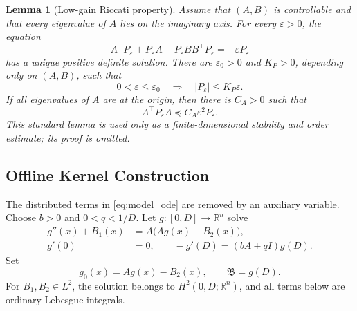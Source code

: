\documentclass[journal]{IEEEtran}
\newtheorem{lemma}{Lemma}
\newcommand{\R}{\mathbb R}
\newcommand{\eps}{\varepsilon}
\newcommand{\Bcal}{\mathfrak B}
\newcommand{\abs}[1]{\left|#1\right|}
\begin{document}
\begin{lemma}[Low-gain Riccati property]\label{lem:riccati}
Assume that \((A,B)\) is controllable and that every eigenvalue of \(A\) lies on the imaginary axis. For every \(\eps>0\), the equation
\begin{equation}
 A^\top P_\eps+P_\eps A-P_\eps BB^\top P_\eps=-\eps P_\eps \label{eq:ARE}
\end{equation}
has a unique positive definite solution. There are \(\eps_0>0\) and \(K_P>0\), depending only on \((A,B)\), such that
\begin{equation}
 0<\eps\leq\eps_0\quad\Longrightarrow\quad \abs{P_\eps}\leq K_P\eps. \label{eq:P_order}
\end{equation}
If all eigenvalues of \(A\) are at the origin, then there is \(C_A>0\) such that
\begin{equation}
 A^\top P_\eps A\preceq C_A\eps^2P_\eps. \label{eq:nilpotent_P_bound}
\end{equation}
This standard lemma is used only as a finite-dimensional stability and order estimate; its proof is omitted.
\end{lemma}

\subsection{Offline Kernel Construction}

The distributed terms in \eqref{eq:model_ode} are removed by an auxiliary variable. Choose \(b>0\) and \(0<q<1/D\). Let \(g:[0,D]\to\R^n\) solve
\begin{align}
 g''(x)+B_1(x)&=A\big(Ag(x)-B_2(x)\big), \label{eq:g_bvp}\\
 g'(0)&=0, \qquad -g'(D)=(bA+qI)g(D). \label{eq:g_bc}
\end{align}
Set
\begin{equation}
 g_0(x)=Ag(x)-B_2(x),\qquad \Bcal=g(D). \label{eq:g0_Bcal}
\end{equation}
For \(B_1,B_2\in L^2\), the solution belongs to \(H^2(0,D;\R^n)\), and all terms below are ordinary Lebesgue integrals.
\end{document}
